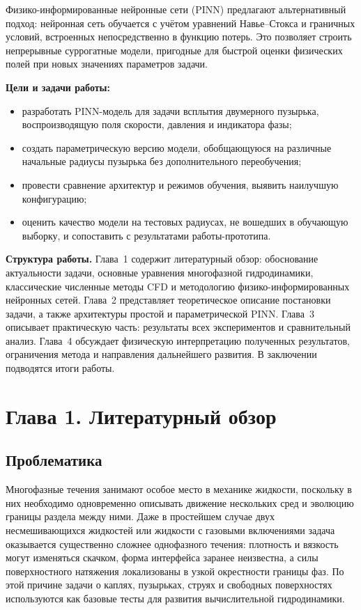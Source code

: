 \documentclass[12pt,a4paper]{article}
\begin{document}
Физико-информированные нейронные сети (PINN) предлагают альтернативный подход:
нейронная сеть обучается с учётом уравнений Навье--Стокса и граничных условий,
встроенных непосредственно в функцию потерь. Это позволяет строить
непрерывные суррогатные модели, пригодные для быстрой оценки физических полей
при новых значениях параметров задачи.

\medskip
\noindent\textbf{Цели и задачи работы:}
\begin{itemize}
  \item разработать PINN-модель для задачи всплытия двумерного пузырька,
        воспроизводящую поля скорости, давления и индикатора фазы;
  \item создать параметрическую версию модели, обобщающуюся на различные
        начальные радиусы пузырька без дополнительного переобучения;
  \item провести сравнение архитектур и режимов обучения, выявить наилучшую
        конфигурацию;
  \item оценить качество модели на тестовых радиусах, не вошедших в
        обучающую выборку, и сопоставить с результатами работы-прототипа.
\end{itemize}

\medskip
\noindent\textbf{Структура работы.}
Глава~1 содержит литературный обзор: обоснование актуальности задачи,
основные уравнения многофазной гидродинамики, классические численные методы
CFD и методологию физико-информированных нейронных сетей.
Глава~2 представляет теоретическое описание постановки задачи, а также
архитектуры простой и параметрической PINN.
Глава~3 описывает практическую часть: результаты всех экспериментов и
сравнительный анализ.
Глава~4 обсуждает физическую интерпретацию полученных результатов,
ограничения метода и направления дальнейшего развития.
В заключении подводятся итоги работы.

\newpage

\section{Глава 1. Литературный обзор}

\subsection{Проблематика}

Многофазные течения занимают особое место в механике жидкости, поскольку в них
необходимо одновременно описывать движение нескольких сред и эволюцию границы
раздела между ними. Даже в простейшем случае двух несмешивающихся жидкостей или
жидкости с газовыми включениями задача оказывается существенно сложнее
однофазного течения: плотность и вязкость могут изменяться скачком, форма
интерфейса заранее неизвестна, а силы поверхностного натяжения локализованы в
узкой окрестности границы фаз. По этой причине задачи о каплях, пузырьках,
струях и свободных поверхностях используются как базовые тесты для развития
вычислительной гидродинамики.
\end{document}
